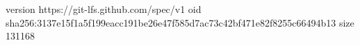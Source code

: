 version https://git-lfs.github.com/spec/v1
oid sha256:3137e15f1a5f199eacc191be26e47f585d7ac73c42bf471e82f8255c66494b13
size 131168
